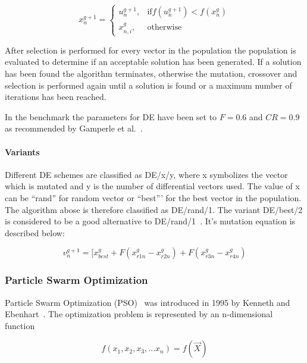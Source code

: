 \begin{equation}
    x_{n}^{g+1} =
    \begin{cases}
      u_{n}^{g+1}, & \text{if} f(u_{n}^{g+1}) < f(x_{n}^{g}) \\
      x_{n,i}^{g}, & \text{otherwise}
\end{cases}
\end{equation}

After selection is performed for every vector in the population the population is evaluated to determine if an acceptable solution has been generated. If a solution has been found the algorithm terminates, otherwise the mutation, crossover and selection is performed again until a solution is found or a maximum number of iterations has been reached.

In the benchmark the parameters for DE have been set to $F = 0.6$ and $CR=0.9$ as recommended by Gamperle et al.~\cite{gamperle2002parameter}.

\paragraph{Variants}

Different DE schemes are classified as DE/x/y, where x symbolizes the vector which is mutated and y is the number of differential vectors used. The value of x can be ``rand'' for random vector or ``best''' for the best vector in the population. The algorithm abose is therefore classified as DE/rand/1. The variant DE/best/2 is considered to be a good alternative to DE/rand/1~\cite{qin2009differential}. It's mutation equation is described below:

\begin{equation}
v_{n}^{g+1} = [ x_{best}^{g} + F(x_{r1n}^{g} - x_{r2n}^{g}) + F(x_{r3n}^{g} - x_{r4n}^{g})
\end{equation}

\subsubsection{Particle Swarm Optimization}

Particle Swarm Optimization (PSO)~\cite{Das2008} was introduced in 1995 by Kenneth and Ebenhart~\cite{eberhart1995new}. The optimization problem is represented by an n-dimensional function

\begin{equation}
  f(x_1,x_2,x_3,...x_n) = f(\vec{X})
\end{equation}

